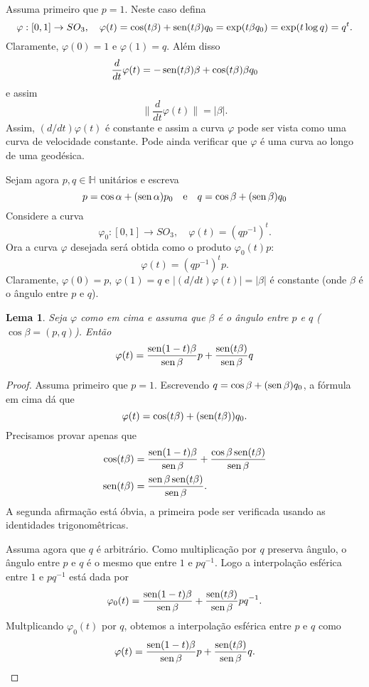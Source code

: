 \documentclass[12pt]{amsart}
\newcommand{\Ha}{\mathbb H}
\DeclareMathOperator{\sen}{\textrm{\rm sen}}
\newtheorem{lemma}[theorem]{Lema}
\theoremstyle{definition}
\begin{document}
Assuma primeiro que $p=1$. Neste caso defina 
\[
    \varphi:[0,1]\to SO_3,\quad \varphi(t)=\cos(t\beta)+\sen(t\beta)q_0=\exp(t\beta q_0)=
    \exp(t\log q)=q^t.
\]
Claramente, $\varphi(0)=1$ e $\varphi(1)=q$. Além disso 
\[
    \frac d{dt}\varphi(t)=-\sen(t\beta)\beta+\cos(t\beta)\beta q_0
\]
e assim 
\[
    \|\frac d{dt}\varphi(t)\|=|\beta|.
\]
Assim, $(d/dt)\varphi(t)$ é constante e assim a curva $\varphi$ pode ser vista como uma curva de velocidade
constante. Pode ainda verificar que $\varphi$ é uma curva ao longo de uma geodésica. 

Sejam agora $p,q\in\Ha$ unitários e escreva 
\[
p=\cos\alpha+(\sen\alpha)p_0\quad\mbox{e}\quad q=\cos\beta+(\sen\beta)q_0
\]
Considere a curva 
\[
    \varphi_0:[0,1]\to SO_3,\quad \varphi(t)=(qp^{-1})^t.
\]
Ora a curva $\varphi$ desejada será obtida como o produto $\varphi_0(t)p$:
\[
    \varphi(t)=(qp^{-1})^tp.
\]
Claramente, $\varphi(0)=p$, $\varphi(1)=q$ e $|(d/dt)\varphi(t)|=|\beta|$ é constante (onde $\beta$ é o ângulo entre $p$ e $q$). 



\begin{lemma}
    Seja $\varphi$ como em cima e assuma que $\beta$ é o ângulo entre $p$ e $q$ ($\cos\beta=(p,q)$). Então 
    \[
        \varphi(t)=\frac{\sen(1-t)\beta}{\sen\beta}p+\frac{\sen(t\beta)}{\sen{\beta}}q
    \]
\end{lemma}
\begin{proof}
Assuma primeiro que $p=1$. Escrevendo $q=\cos\beta+(\sen\beta) q_0$, 
a fórmula em cima dá que 
\[
    \varphi(t)=\cos(t\beta)+(\sen(t\beta))q_0.
\]
Precisamos provar apenas que 
\begin{align*}
    \cos(t\beta)&=\frac{\sen(1-t)\beta}{\sen\beta}+\frac{\cos\beta\sen(t\beta)}{\sen\beta}\\
    \sen(t\beta)&=\frac{\sen\beta\sen(t\beta)}{\sen\beta}.
\end{align*}
A segunda afirmação está óbvia, a primeira pode ser verificada usando as identidades trigonomêtricas.

Assuma agora que $q$ é arbitrário.  Como multiplicação por $q$ preserva ângulo, 
o ângulo entre $p$ e $q$ é o mesmo que entre $1$ e $pq^{-1}$. Logo a interpolação esférica entre $1$ e $pq^{-1}$ está dada por 
\[
    \varphi_0(t)=\frac{\sen(1-t)\beta}{\sen\beta}+\frac{\sen(t\beta)}{\sen{\beta}}pq^{-1}.
\]
Multplicando $\varphi_0(t)$ por $q$, obtemos a interpolação esférica entre $p$ e $q$ como 
\[
    \varphi(t)=\frac{\sen(1-t)\beta}{\sen\beta}p+\frac{\sen(t\beta)}{\sen{\beta}}q.
\]
\end{proof}
\end{document}
